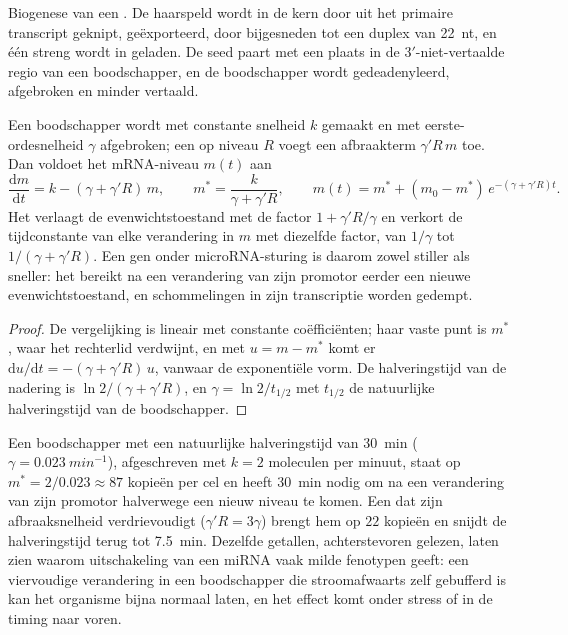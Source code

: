 \begin{omfigure}
{\small Biogenese van een . De haarspeld wordt in de kern door
 uit het primaire transcript geknipt, geëxporteerd, door 
bijgesneden tot een duplex van \qty{22}{nt}, en één streng wordt in
 geladen. De seed paart met een plaats in de
3$'$-niet-vertaalde regio van een boodschapper, en de boodschapper
wordt gedeadenyleerd, afgebroken en minder vertaald.}
\end{omfigure}

\begin{theorem}\label{thm:b3:rna-regulation:mirna-kinetics}
Een boodschapper wordt met constante snelheid $k$ gemaakt en met
eerste-ordesnelheid $\gamma$ afgebroken; een  op niveau $R$
voegt een afbraakterm $\gamma' R\, m$ toe. Dan voldoet het mRNA-niveau
$m(t)$ aan
\[
\frac{\mathrm{d}m}{\mathrm{d}t} = k - (\gamma + \gamma' R)\, m,
\qquad
m^{*} = \frac{k}{\gamma + \gamma' R},
\qquad
m(t) = m^{*} + (m_{0} - m^{*})\,e^{-(\gamma + \gamma' R)t}.
\]
Het  verlaagt de evenwichtstoestand met de factor $1 + \gamma' R/
\gamma$ en verkort de tijdconstante van elke verandering in $m$ met
diezelfde factor, van $1/\gamma$ tot $1/(\gamma + \gamma' R)$. Een gen
onder microRNA-sturing is daarom zowel stiller als sneller: het
bereikt na een verandering van zijn promotor eerder een nieuwe
evenwichtstoestand, en schommelingen in zijn transcriptie worden
gedempt.
\end{theorem}
\begin{proof}
De vergelijking is lineair met constante coëfficiënten; haar vaste punt
is $m^{*}$, waar het rechterlid verdwijnt, en met $u = m - m^{*}$ komt
er $\mathrm{d}u/\mathrm{d}t = -(\gamma + \gamma' R)\,u$, vanwaar de
exponentiële vorm. De halveringstijd van de nadering is $\ln 2/(\gamma + \gamma'
R)$, en $\gamma = \ln 2 / t_{1/2}$ met $t_{1/2}$ de natuurlijke
halveringstijd van de boodschapper.
\end{proof}

\begin{example}\label{ex:b3:rna-regulation:fourfold}
Een boodschapper met een natuurlijke halveringstijd van \qty{30}{min} ($\gamma =
\qty{0.023}{min^{-1}}$), afgeschreven met $k = 2$ moleculen per minuut,
staat op $m^{*} = 2/0.023 \approx 87$ kopieën per cel en heeft
\qty{30}{min} nodig om na een verandering van zijn promotor halverwege
een nieuw niveau te komen. Een  dat zijn afbraaksnelheid
verdrievoudigt ($\gamma' R = 3\gamma$) brengt hem op $22$ kopieën en
snijdt de halveringstijd terug tot \qty{7.5}{min}. Dezelfde getallen,
achterstevoren gelezen, laten zien waarom uitschakeling van een miRNA
vaak milde fenotypen geeft: een viervoudige verandering in een
boodschapper die stroomafwaarts zelf gebufferd is kan het organisme
bijna normaal laten, en het effect komt onder stress of in de timing
naar voren.
\end{example}


